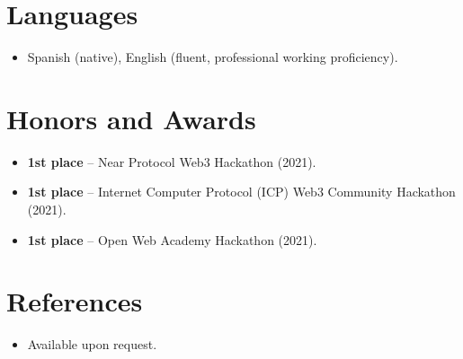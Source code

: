 \documentclass[11pt,a4paper,sans]{moderncv}
\begin{document}
\section{Languages}
\vspace{1pt}
\begin{itemize}
\item Spanish (native), English (fluent, professional working proficiency).
\end{itemize}


\section{Honors and Awards}
\vspace{1pt}
\begin{itemize}
\item{\textbf{1st place} -- Near Protocol Web3 Hackathon (2021).}
\item{\textbf{1st place} -- Internet Computer Protocol (ICP) Web3 Community Hackathon (2021).}
\item{\textbf{1st place} -- Open Web Academy Hackathon (2021).}
\end{itemize}


\section{References}
\vspace{1pt}
\begin{itemize}
\item{Available upon request.}
\end{itemize}
\end{document}
